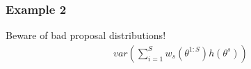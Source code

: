 \documentclass{beamer}
\begin{document}
% 
% 
% 
% 
% 
% 
% 
% 
% 
% 

\begin{frame}[fragile]
\frametitle{Example 2}

Beware of bad proposal distributions!
\begin{align*}
var\left( \sum_{i=1}^S w_s(\theta^{1:S})h(\theta^s) \right)
\end{align*}


\end{frame}
\end{document}
